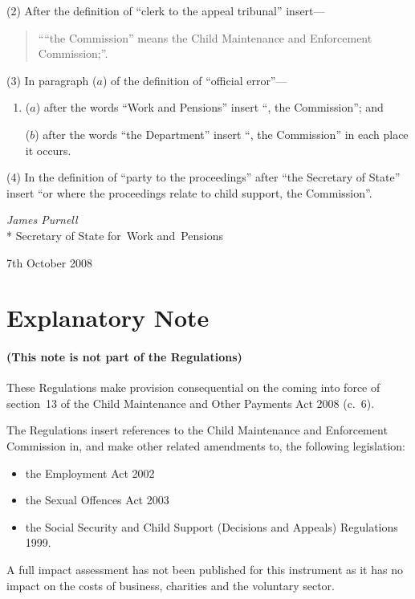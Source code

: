 \documentclass[12pt,a4paper]{article}
\begin{document}
(2) After the definition of “clerk to the appeal tribunal” insert—
\begin{quotation}
““the Commission” means the Child Maintenance and Enforcement Commission;”.
\end{quotation}

(3) In paragraph ($a$)  of the definition of “official error”—
\begin{enumerate}\item[]
($a$) after the words “Work and Pensions” insert “, the Commission”; and

($b$) after the words “the Department” insert “, the Commission” in each place it occurs.
\end{enumerate}

(4) In the definition of “party to the proceedings” after “the Secretary of State” insert “or where the proceedings relate to child support, the Commission”. 

\bigskip


{\raggedleft
\emph{James Purnell}\\*
Secretary
of State %
for~Work and~Pensions

}

7th October 2008

\small

\part{Explanatory Note}

\renewcommand\parthead{— Explanatory Note}

\subsection*{(This note is not part of the Regulations)}

These Regulations make provision consequential on the coming into force of section~13 of the Child Maintenance and Other Payments Act 2008 (c.~6).

The Regulations insert references to the Child Maintenance and Enforcement Commission in, and make other related amendments to, the following legislation:
\begin{itemize}
\item    the Employment Act 2002
\item
    the Sexual Offences Act 2003
\item
    the Social Security and Child Support (Decisions and Appeals) Regulations 1999. 
\end{itemize}

A full impact assessment has not been published for this instrument as it has no impact on the costs of business, charities and the voluntary sector. 
\end{document}
